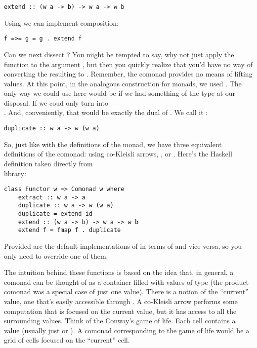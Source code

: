 \begin{Verbatim}[commandchars=\\\{\}]
extend :: (w a -> b) -> w a -> w b
\end{Verbatim}
Using  we can implement composition:

\begin{Verbatim}[commandchars=\\\{\}]
f =>= g = g . extend f
\end{Verbatim}
Can we next dissect ? You might be tempted to say, why
not just apply the function  to the
argument , but then you quickly realize that you'd have no
way of converting the resulting  to . Remember,
the comonad provides no means of lifting values. At this point, in the
analogous construction for monads, we used . The only way
we could use  here would be if we had something of the type
 at our disposal. If we coud only turn 
into\\ . And, conveniently, that would be exactly the
dual of . We call it :

\begin{Verbatim}[commandchars=\\\{\}]
duplicate :: w a -> w (w a)
\end{Verbatim}
So, just like with the definitions of the monad, we have three
equivalent definitions of the comonad: using co-Kleisli arrows,
, or . Here's the Haskell definition
taken directly from\\  library:

\begin{Verbatim}[commandchars=\\\{\}]
class Functor w => Comonad w where
    extract :: w a -> a
    duplicate :: w a -> w (w a)
    duplicate = extend id
    extend :: (w a -> b) -> w a -> w b
    extend f = fmap f . duplicate
\end{Verbatim}
Provided are the default implementations of  in terms of
 and vice versa, so you only need to override one of
them.

The intuition behind these functions is based on the idea that, in
general, a comonad can be thought of as a container filled with values
of type  (the product comonad was a special case of just one
value). There is a notion of the ``current'' value, one that's easily
accessible through . A co-Kleisli arrow performs some
computation that is focused on the current value, but it has access to
all the surrounding values. Think of the Conway's game of life. Each
cell contains a value (usually just  or ). A
comonad corresponding to the game of life would be a grid of cells
focused on the ``current'' cell.

